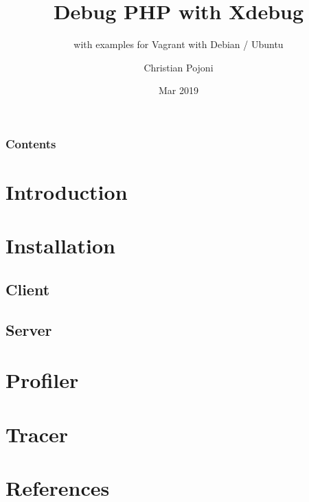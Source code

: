 \documentclass[
    hyperref={bookmarks=true}
]{beamer}
\title{Debug PHP with Xdebug}
\subtitle{with examples for Vagrant with Debian / Ubuntu}
\author{Christian Pojoni}
\institute{\url{www.secret-source.eu}}
\date{Mar 2019}
\begin{document}
\frame{\titlepage}
\begin{frame}\frametitle{Contents}
    \tableofcontents
\end{frame}

\section{Introduction}


\section{Installation} 
\subsection{Client}


\subsection{Server}


\section{Profiler}


\section{Tracer}


\section*{References}\addtocounter{section}{1}

\end{document}
